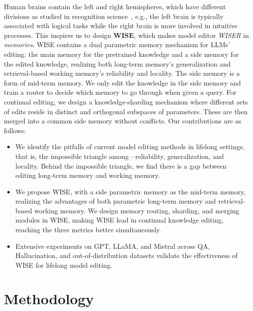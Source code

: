 \documentclass{article}
\begin{document}
Human brains contain the left and right hemispheres, which have different divisions as studied in recognition science~\cite{brain_division_1,brain_division_2}, e.g., the left brain is typically associated with logical tasks while the right brain is more involved in intuitive processes. This inspires us to design \textbf{WISE}, which makes model editor \textit{WISER} in \textit{memories}. WISE contains a dual parametric memory mechanism for LLMs' editing: the main memory for the pretrained knowledge and a side memory for the edited knowledge, realizing both long-term memory's generalization and retrieval-based working memory's reliability and locality. The side memory is a form of mid-term memory. 
We only edit the knowledge in the side memory and train a router to decide which memory to go through when given a query. 
For continual editing, we design a knowledge-sharding mechanism where different sets of edits reside in distinct and orthogonal subspaces of parameters. These are then merged into a common side memory without conflicts.
Our contributions are as follows:
\begin{itemize}[leftmargin=*,nosep]
    \item We identify the pitfalls of current model editing methods in lifelong settings, that is, the impossible triangle among---reliability, generalization, and locality. Behind the impossible triangle, we find there is a gap between editing long-term memory and working memory.
    \item We propose WISE, with a side parametric memory as the mid-term memory, realizing the advantages of both parametric long-term memory and retrieval-based working memory. We design memory routing, sharding, and merging modules in WISE, making WISE lead in continual knowledge editing, reaching the three metrics better simultaneously.
    \item Extensive experiments on GPT, LLaMA, and Mistral across QA, Hallucination,  and out-of-distribution datasets validate the effectiveness of WISE for lifelong model editing.
\end{itemize}



\section{Methodology}\label{sec:method}
\end{document}
